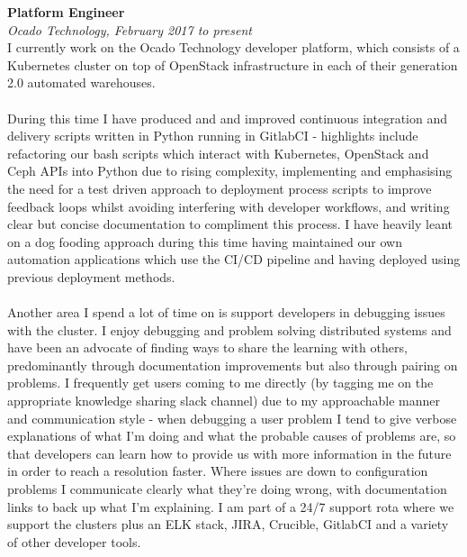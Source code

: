 \documentclass{article}
\begin{document}
\begin{flushleft}
\textbf{Platform Engineer}\\
\textit{Ocado Technology, February 2017 to present}\\[5pt]
I currently work on the Ocado Technology developer platform, which consists of a Kubernetes cluster on top of OpenStack infrastructure in each of their generation 2.0 automated warehouses. 


\paragraph{}During this time I have produced and and improved continuous integration and delivery scripts written in Python running in GitlabCI - highlights include refactoring our bash scripts which interact with Kubernetes, OpenStack and Ceph APIs into Python due to rising complexity, implementing and emphasising the need for a test driven approach to deployment process scripts to improve feedback loops whilst avoiding interfering with developer workflows, and writing clear but concise documentation to compliment this process. I have heavily leant on a dog fooding approach during this time having maintained our own automation applications which use the CI/CD pipeline and having deployed using previous deployment methods.


\paragraph{}Another area I spend a lot of time on is support developers in debugging issues with the cluster. I enjoy debugging and problem solving distributed systems and have been an advocate of finding ways to share the learning with others, predominantly through documentation improvements but also through pairing on problems. I frequently get users coming to me directly (by tagging me on the appropriate knowledge sharing slack channel) due to my approachable manner and communication style - when debugging a user problem I tend to give verbose explanations of what I'm doing and what the probable causes of problems are, so that developers can learn how to provide us with more information in the future in order to reach a resolution faster. Where issues are down to configuration problems I communicate clearly what they're doing wrong, with documentation links to back up what I'm explaining. I am part of a 24/7 support rota where we support the clusters plus an ELK stack, JIRA, Crucible, GitlabCI and a variety of other developer tools. 



\end{flushleft}
\end{document}
